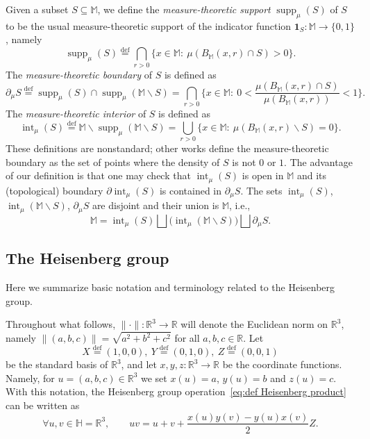\documentclass[11pt,reqno]{amsart}
\renewcommand{\H}{\mathbb{H}}
\newcommand{\R}{\mathbb{R}}
\newcommand{\bbM}{\mathbb{M}}
\newcommand{\0}{\mathbf{0}}
\renewcommand{\1}{\mathbf 1}
\newcommand{\from}{\colon}
\renewcommand{\subset}{\subseteq}
\newcommand{\eqdef}{\stackrel{\mathrm{def}}{=}}
\renewcommand{\setminus}{\smallsetminus}
\theoremstyle{remark}
\DeclareMathOperator{\inter}{int}
\DeclareMathOperator{\supp}{supp}
\begin{document}
Given a subset $S\subset \bbM$, we define the {\em measure-theoretic support} $\supp_{\mu}(S)$ of $S$ to be the usual measure-theoretic support of the indicator function $\1_S\from \bbM\to \{0,1\}$, namely
\begin{equation}\label{eq:def supp mu}
\supp_{\mu}(S)\eqdef \bigcap_{r>0} \big\{x\in \bbM:\ \mu(B_\bbM(x,r)\cap S)>0\big\}.
\end{equation}
The {\em measure-theoretic boundary} of $S$ is defined as
\begin{equation}\label{eq:def partial mu}
\partial_\mu S\eqdef \supp_\mu(S) \cap \supp_\mu(\bbM\setminus S)= \bigcap_{r>0} \Big\{x\in \bbM:\ 0<\frac{\mu(B_\bbM(x,r)\cap S)}{\mu(B_\bbM(x,r))}<1\Big\}.
\end{equation}
The {\em measure-theoretic interior} of $S$ is defined as
\begin{equation}\label{eq:def inter mu}
\inter_\mu (S)\eqdef \bbM\setminus \supp_\mu(\bbM\setminus S)= \bigcup_{r>0}\big\{x\in \bbM: \ \mu(B_\bbM(x,r)\setminus S)=0\big\}.
\end{equation}
These definitions are nonstandard; other works define the measure-theoretic boundary as the set of points where the density of $S$ is not $0$ or $1$.  The advantage of our definition is that one may check that  $\inter_\mu (S)$ is open in $\bbM$ and its (topological) boundary $\partial \inter_\mu (S)$ is contained in $\partial_\mu S$. The sets $\inter_\mu (S)$, $\inter_\mu (\bbM\setminus S)$, $\partial_\mu S$ are disjoint and their union is $\bbM$, i.e.,
\begin{equation}\label{eq:3disjoint union}
\bbM=\inter_\mu (S)\bigsqcup \big(\inter_\mu (\bbM\setminus S)\big)\bigsqcup \partial_\mu S.
\end{equation}





\subsection{The Heisenberg group}\label{sec:Prelim heis} Here we summarize basic notation and terminology related to the Heisenberg group.


Throughout what follows, $\|\cdot\|\from \R^3\to \R$ will denote the Euclidean norm on $\R^3$, namely  $\|(a,b,c)\|=\sqrt{a^2+b^2+c^2}$ for all $a,b,c\in \R$.  Let $$X\eqdef(1,0,0),\ Y\eqdef(0,1,0),\ Z\eqdef (0,0,1)$$ be the standard basis of $\R^3$, and let $x,y,z\from \R^3\to \R$ be the coordinate functions.  Namely, for $u=(a,b,c)\in \R^3$ we set $x(u)=a$, $y(u)=b$ and $z(u)=c$.  With this notation, the Heisenberg group operation~\eqref{eq:def Heisenberg product} can be written as
\begin{equation}\label{eq:group operation}
\forall  u,v\in \H=\R^3,\qquad   u v = u+v+ \frac{x(u)y(v)-y(u)x(v)}{2} Z.
\end{equation}
\end{document}

